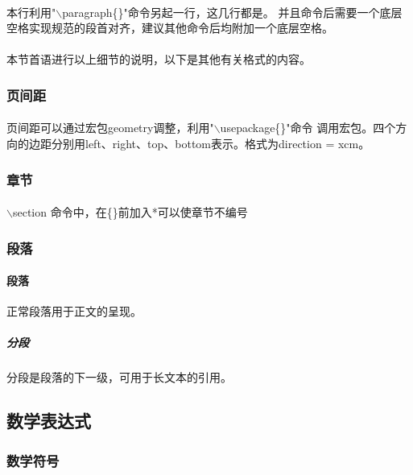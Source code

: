 \documentclass[UTF8]{ctexart}
\begin{document}
\paragraph{} 本行利用"$\backslash$paragraph\{\}"命令另起一行，这几行都是。
并且命令后需要一个底层空格实现规范的段首对齐，建议其他命令后均附加一个底层空格。
\paragraph{} 本节首语进行以上细节的说明，以下是其他有关格式的内容。



\subsubsection{页间距}
\paragraph{}
页间距可以通过宏包geometry调整，利用"$\backslash$usepackage\{\}"命令
调用宏包。四个方向的边距分别用left、right、top、bottom表示。格式为direction = xcm。

\subsubsection{章节}
\paragraph{}
$\backslash$section{} 命令中，在\{\}前加入*可以使章节不编号

\subsubsection{段落}

\paragraph{段落}
正常段落用于正文的呈现。


\subparagraph{分段}
分段是段落的下一级，可用于长文本的引用。

\subsection{数学表达式}

\subsubsection{数学符号}
\end{document}
